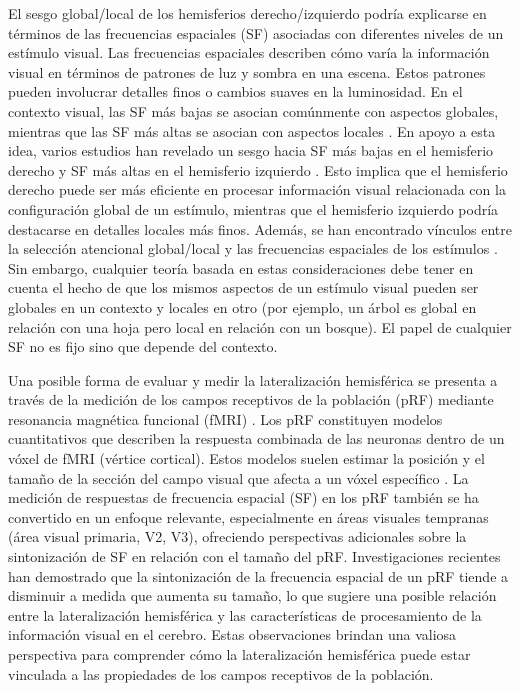 \documentclass{article}
\begin{document}
	El sesgo global/local de los hemisferios derecho/izquierdo podría explicarse en términos de las frecuencias espaciales (SF) asociadas con diferentes niveles de un estímulo visual. Las frecuencias espaciales describen cómo varía la información visual en términos de patrones de luz y sombra en una escena. Estos patrones pueden involucrar detalles finos o cambios suaves en la luminosidad. En el contexto visual, las SF más bajas se asocian comúnmente con aspectos globales, mientras que las SF más altas se asocian con aspectos locales \cite{flevaris_spatial_2016}. En apoyo a esta idea, varios estudios han revelado un sesgo hacia SF más bajas en el hemisferio derecho y SF más altas en el hemisferio izquierdo \cite{flevaris_spatial_2016}. Esto implica que el hemisferio derecho puede ser más eficiente en procesar información visual relacionada con la configuración global de un estímulo, mientras que el hemisferio izquierdo podría destacarse en detalles locales más finos. Además, se han encontrado vínculos entre la selección atencional global/local y las frecuencias espaciales de los est\'imulos \cite{flevaris_spatial_2016}. Sin embargo, cualquier teoría basada en estas consideraciones debe tener en cuenta el hecho de que los mismos aspectos de un estímulo visual pueden ser globales en un contexto y locales en otro (por ejemplo, un árbol es global en relación con una hoja pero local en relación con un bosque). El papel de cualquier SF no es fijo sino que depende del contexto.	
	
	Una posible forma de evaluar y medir la lateralización hemisférica se presenta a través de la medición de los campos receptivos de la población (pRF) mediante resonancia magnética funcional (fMRI) \cite{dumoulin_population_2008, kay_principles_2018} . Los pRF constituyen modelos cuantitativos que describen la respuesta combinada de las neuronas dentro de un vóxel de fMRI (vértice cortical). Estos modelos suelen estimar la posición y el tamaño de la sección del campo visual que afecta a un vóxel específico \cite{wandell_computational_2015}. La medición de respuestas de frecuencia espacial (SF) en los pRF también se ha convertido en un enfoque relevante, especialmente en áreas visuales tempranas (área visual primaria, V2, V3), ofreciendo perspectivas adicionales sobre la sintonización de SF en relación con el tamaño del pRF. Investigaciones recientes \cite{aghajari_population_2020, broderick_mapping_2022} han demostrado que la sintonización de la frecuencia espacial de un pRF tiende a disminuir a medida que aumenta su tamaño, lo que sugiere una posible relación entre la lateralización hemisférica y las características de procesamiento de la información visual en el cerebro. Estas observaciones brindan una valiosa perspectiva para comprender cómo la lateralización hemisférica puede estar vinculada a las propiedades de los campos receptivos de la población.
	
\end{document}
